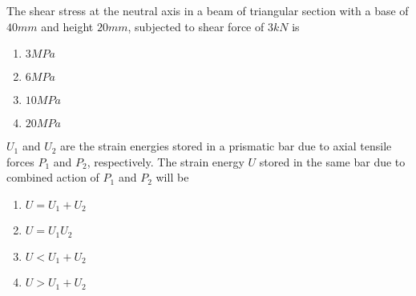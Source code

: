 \item The shear stress at the neutral axis in a beam of triangular section with a base of $40mm$ and height $20mm$, subjected to shear force of $3kN$ is

\hfill{}
\begin{enumerate}
\item $3MPa$
\item $6MPa$
\item $10MPa$
\item $20MPa$
\end{enumerate}

\item $U_1$ and $U_2$ are the strain energies stored in a prismatic bar due to axial tensile forces $P_1$ and $P_2$, respectively. The strain energy $U$ stored in the same bar due to combined action of $P_1$ and $P_2$ will be

\hfill{}
\begin{enumerate}
\item $U=U_1+U_2$
\item $U=U_1U_2$
\item $U<U_1+U_2$
\item $U>U_1+U_2$
\end{enumerate}


